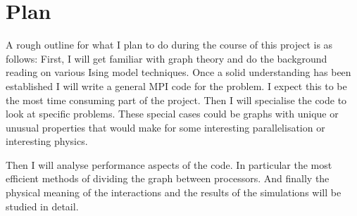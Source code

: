 \documentclass{article}
\begin{document}
\section{Plan}

A rough outline for what I plan to do during the course of this project is as follows: First, I will get familiar with graph theory and do the background reading on various Ising model techniques. Once a solid understanding has been established I will write a general MPI code for the problem. I expect this to be the most time consuming part of the project. Then I will specialise the code to look at specific problems. These special cases could be graphs with unique or unusual properties that would make for some interesting parallelisation or interesting physics. 

Then I will analyse performance aspects of the code. In particular the most efficient methods of dividing the graph between processors. And finally the physical meaning of the interactions and the results of the simulations will be studied in detail.
\end{document}
